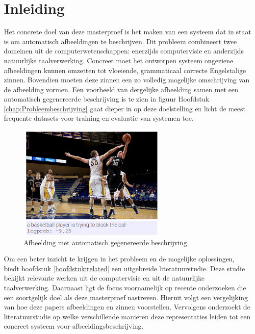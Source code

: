 \chapter{Inleiding}
\label{inleiding}
Het concrete doel van deze masterproef is het maken van een systeem dat in staat is om automatisch afbeeldingen te beschrijven. Dit probleem combineert twee domeinen uit de computerwetenschappen: enerzijds computervisie en anderzijds natuurlijke taalverwerking. Concreet moet het ontworpen systeem ongeziene afbeeldingen kunnen omzetten tot vloeiende, grammaticaal correcte Engelstalige zinnen. Bovendien moeten deze zinnen een zo volledig mogelijke omschrijving van de afbeelding vormen. Een voorbeeld van dergelijke afbeelding samen met een automatisch gegenereerde beschrijving is te zien in figuur Hoofdstuk \ref{chap:Probleembeschrijving} gaat dieper in op deze doelstelling en licht de meest frequente datasets voor training en evaluatie van systemen toe.

\begin{figure}[tb]
    \centering
    \includegraphics[width=0.65\textwidth]{Images/Results/Perfect/blocking_the_ball}
    \caption{Afbeelding met automatisch gegenereerde beschrijving}
    \label{fig:example_img}
\end{figure}

Om een beter inzicht te krijgen in het probleem en de mogelijke oplossingen, biedt hoofdstuk \ref{hoofdstuk:related} een uitgebreide literatuurstudie. Deze studie bekijkt relevante werken uit de computervisie en uit de natuurlijke taalverwerking. Daarnaast ligt de focus voornamelijk op recente onderzoeken die een soortgelijk doel als deze masterproef nastreven. Hieruit volgt een vergelijking van hoe deze papers afbeeldingen en zinnen voorstellen. Vervolgens onderzoekt de literatuurstudie op welke verschillende manieren deze representaties leiden tot een concreet systeem voor afbeeldingsbeschrijving.

